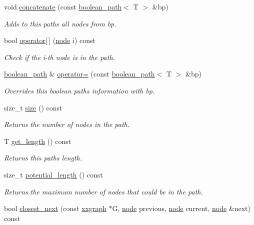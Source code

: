 \begin{DoxyCompactItemize}
void \hyperlink{classlgraph_1_1boolean__path_ad2a4186c5836ac554fefeace9b9d775f}{concatenate} (const \hyperlink{classlgraph_1_1boolean__path}{boolean\+\_\+path}$<$ T $>$ \&bp)
\begin{DoxyCompactList}\small\item\em Adds to this paths all nodes from bp. \end{DoxyCompactList}\item 
bool \hyperlink{classlgraph_1_1boolean__path_a16895c9aebb5e989489b4523a7b6696a}{operator\mbox{[}$\,$\mbox{]}} (\hyperlink{namespacelgraph_a397169dd66adf725210a30fb7251773e}{node} i) const
\begin{DoxyCompactList}\small\item\em Check if the i-\/th node is in the path. \end{DoxyCompactList}\item 
\hyperlink{classlgraph_1_1boolean__path}{boolean\+\_\+path} \& \hyperlink{classlgraph_1_1boolean__path_a72f36b5460f82b2922cec385db08c967}{operator=} (const \hyperlink{classlgraph_1_1boolean__path}{boolean\+\_\+path}$<$ T $>$ \&bp)
\begin{DoxyCompactList}\small\item\em Overrides this boolean path\textquotesingle{}s information with {\itshape bp}. \end{DoxyCompactList}\item 
size\+\_\+t \hyperlink{classlgraph_1_1boolean__path_ac87119984b213d8f2f2d9bb2c40c7b8d}{size} () const
\begin{DoxyCompactList}\small\item\em Returns the number of nodes in the path. \end{DoxyCompactList}\item 
T \hyperlink{classlgraph_1_1boolean__path_aaf0aa82860b5c5b29e6f5533c2599463}{get\+\_\+length} () const
\begin{DoxyCompactList}\small\item\em Returns this path\textquotesingle{}s length. \end{DoxyCompactList}\item 
size\+\_\+t \hyperlink{classlgraph_1_1boolean__path_a64d9fc30eb11b6edec66e0d54e6081b3}{potential\+\_\+length} () const
\begin{DoxyCompactList}\small\item\em Returns the maximum number of nodes that could be in the path. \end{DoxyCompactList}\item 
bool \hyperlink{classlgraph_1_1boolean__path_ae6ceef567800784b5cb751de8c319d5a}{closest\+\_\+next} (const \hyperlink{classlgraph_1_1xxgraph}{xxgraph} $\ast$G, \hyperlink{namespacelgraph_a397169dd66adf725210a30fb7251773e}{node} previous, \hyperlink{namespacelgraph_a397169dd66adf725210a30fb7251773e}{node} current, \hyperlink{namespacelgraph_a397169dd66adf725210a30fb7251773e}{node} \&next) const

\end{DoxyCompactItemize}
